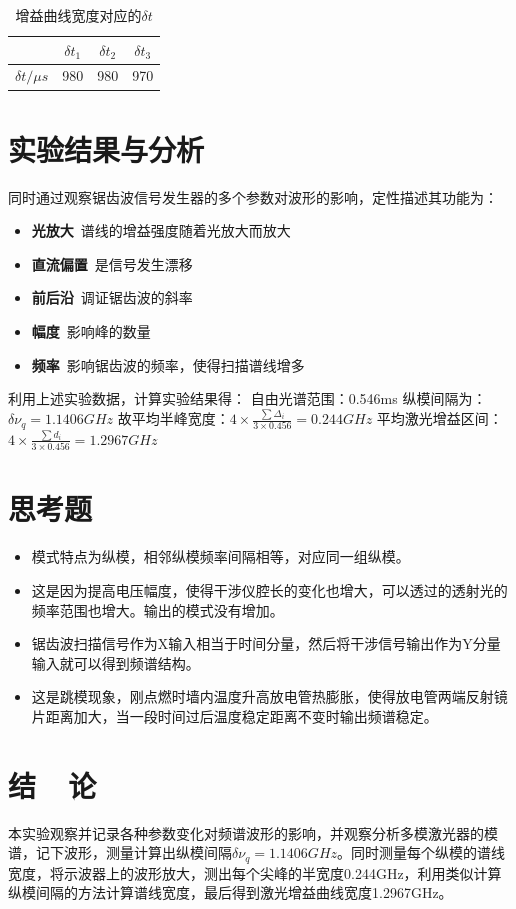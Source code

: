 \documentclass{buaaemp}
\begin{document}
\begin{table}[]
    \centering
    \begin{tabular}{cccc}
    \hline
         &  $\delta t_1$ &$\delta t_2$ & $\delta t_3$ \\ \hline
        $\delta t / \mu s$ & 980 & 980 & 970 \\ \hline
    \end{tabular}
    \caption{增益曲线宽度对应的$ \delta t $}
    \label{tab:3}
\end{table}

\section{实验结果与分析}
同时通过观察锯齿波信号发生器的多个参数对波形的影响，定性描述其功能为：
\begin{itemize}
    \item \textbf{光放大}\ 谱线的增益强度随着光放大而放大
    \item \textbf{直流偏置}\ 是信号发生漂移
    \item \textbf{前后沿}\ 调证锯齿波的斜率
    \item \textbf{幅度}\ 影响峰的数量
    \item \textbf{频率}\ 影响锯齿波的频率，使得扫描谱线增多
\end{itemize}
利用上述实验数据，计算实验结果得：
自由光谱范围：0.546ms
纵模间隔为：$\delta \nu_q=1.1406 GHz$
故平均半峰宽度：$4\times \frac{\sum \Delta_i}{3 \times 0.456}=0.244GHz $
平均激光增益区间：$4\times \frac{\sum d_i}{3 \times 0.456}=1.2967GHz $

\section{思考题}
\begin{itemize}
    \item 模式特点为纵模，相邻纵模频率间隔相等，对应同一组纵模。 
    \item 这是因为提高电压幅度，使得干涉仪腔长的变化也增大，可以透过的透射光的频率范围也增大。输出的模式没有增加。
    \item 锯齿波扫描信号作为X输入相当于时间分量，然后将干涉信号输出作为Y分量输入就可以得到频谱结构。
    \item 这是跳模现象，刚点燃时墙内温度升高放电管热膨胀，使得放电管两端反射镜片距离加大，当一段时间过后温度稳定距离不变时输出频谱稳定。
\end{itemize}


\section{结~~论}
本实验观察并记录各种参数变化对频谱波形的影响，并观察分析多模激光器的模谱，记下波形，测量计算出纵模间隔$\delta \nu_q=1.1406 GHz$。同时测量每个纵模的谱线宽度，将示波器上的波形放大，测出每个尖峰的半宽度0.244GHz，利用类似计算纵模间隔的方法计算谱线宽度，最后得到激光增益曲线宽度1.2967GHz。
\end{document}

